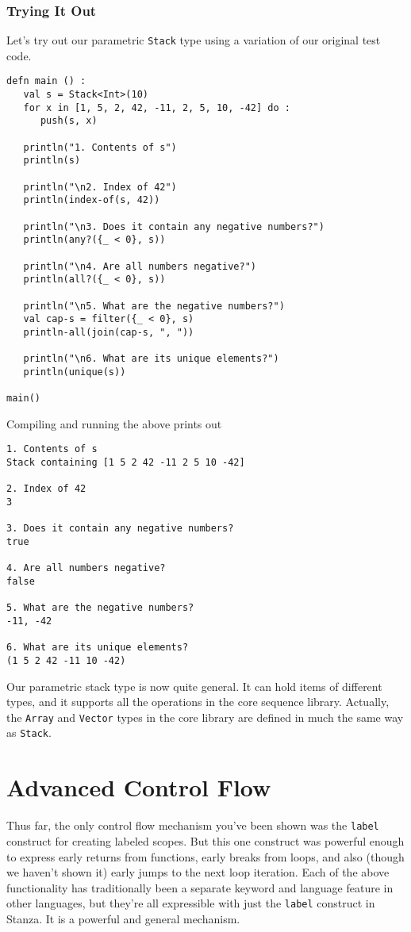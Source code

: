 \documentclass[10pt,oneside]{book}
\begin{document}
\subsection*{Trying It Out}
Let's try out our parametric \texttt{\frenchspacing Stack} type using a variation of our original test code.
\begin{lstlisting}
defn main () :
   val s = Stack<Int>(10)
   for x in [1, 5, 2, 42, -11, 2, 5, 10, -42] do :
      push(s, x)

   println("1. Contents of s")
   println(s)

   println("\n2. Index of 42")
   println(index-of(s, 42))

   println("\n3. Does it contain any negative numbers?")
   println(any?({_ < 0}, s))

   println("\n4. Are all numbers negative?")
   println(all?({_ < 0}, s))

   println("\n5. What are the negative numbers?")
   val cap-s = filter({_ < 0}, s)
   println-all(join(cap-s, ", "))

   println("\n6. What are its unique elements?")
   println(unique(s))

main()
\end{lstlisting}
Compiling and running the above prints out
\begin{lstlisting}
1. Contents of s
Stack containing [1 5 2 42 -11 2 5 10 -42]

2. Index of 42
3

3. Does it contain any negative numbers?
true

4. Are all numbers negative?
false

5. What are the negative numbers?
-11, -42

6. What are its unique elements?
(1 5 2 42 -11 10 -42)
\end{lstlisting}

Our parametric stack type is now quite general. It can hold items of different types, and it supports all the operations in the core sequence library. Actually, the \texttt{\frenchspacing Array} and \texttt{\frenchspacing Vector} types in the core library are defined in much the same way as \texttt{\frenchspacing Stack}.



\chapter{Advanced Control Flow}
Thus far, the only control flow mechanism you've been shown was the \texttt{\frenchspacing label} construct for creating labeled scopes. But this one construct was powerful enough to express early returns from functions, early breaks from loops, and also (though we haven't shown it) early jumps to the next loop iteration. Each of the above functionality has traditionally been a separate keyword and language feature in other languages, but they're all expressible with just the \texttt{\frenchspacing label} construct in Stanza. It is a powerful and general mechanism.
\end{document}
